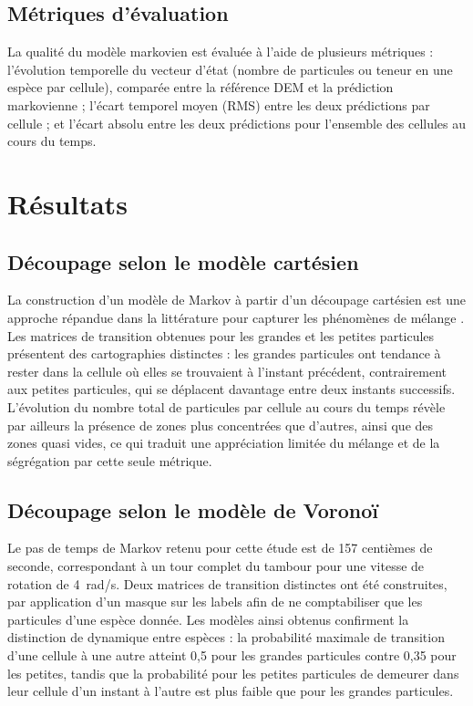 \documentclass{MemoireMaster}
\begin{document}
\subsection{Métriques d'évaluation}
La qualité du modèle markovien est évaluée à l'aide de plusieurs métriques : l'évolution temporelle du vecteur d'état (nombre de particules ou teneur en une espèce par cellule), comparée entre la référence DEM et la prédiction markovienne ; l'écart temporel moyen (RMS) entre les deux prédictions par cellule ; et l'écart absolu entre les deux prédictions pour l'ensemble des cellules au cours du temps.

\section{Résultats}

\subsection{Découpage selon le modèle cartésien}
La construction d'un modèle de Markov à partir d'un découpage cartésien est une approche répandue dans la littérature pour capturer les phénomènes de mélange \cite{doucet2008}. Les matrices de transition obtenues pour les grandes et les petites particules présentent des cartographies distinctes : les grandes particules ont tendance à rester dans la cellule où elles se trouvaient à l'instant précédent, contrairement aux petites particules, qui se déplacent davantage entre deux instants successifs. L'évolution du nombre total de particules par cellule au cours du temps révèle par ailleurs la présence de zones plus concentrées que d'autres, ainsi que des zones quasi vides, ce qui traduit une appréciation limitée du mélange et de la ségrégation par cette seule métrique.

\subsection{Découpage selon le modèle de Voronoï}
Le pas de temps de Markov retenu pour cette étude est de 157 centièmes de seconde, correspondant à un tour complet du tambour pour une vitesse de rotation de 4~rad/s. Deux matrices de transition distinctes ont été construites, par application d'un masque sur les labels afin de ne comptabiliser que les particules d'une espèce donnée. Les modèles ainsi obtenus confirment la distinction de dynamique entre espèces : la probabilité maximale de transition d'une cellule à une autre atteint 0,5 pour les grandes particules contre 0,35 pour les petites, tandis que la probabilité pour les petites particules de demeurer dans leur cellule d'un instant à l'autre est plus faible que pour les grandes particules.
\end{document}
